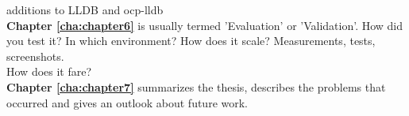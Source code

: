 additions to LLDB and ocp-lldb
\\
\textbf{Chapter \ref{cha:chapter6}} is usually termed 'Evaluation' or 'Validation'. How did you test it? In which environment? How does it scale? Measurements, tests, screenshots.
\\
How does it fare?
\\
\textbf{Chapter \ref{cha:chapter7}} summarizes the thesis, describes the problems that occurred and gives an outlook about future work.


